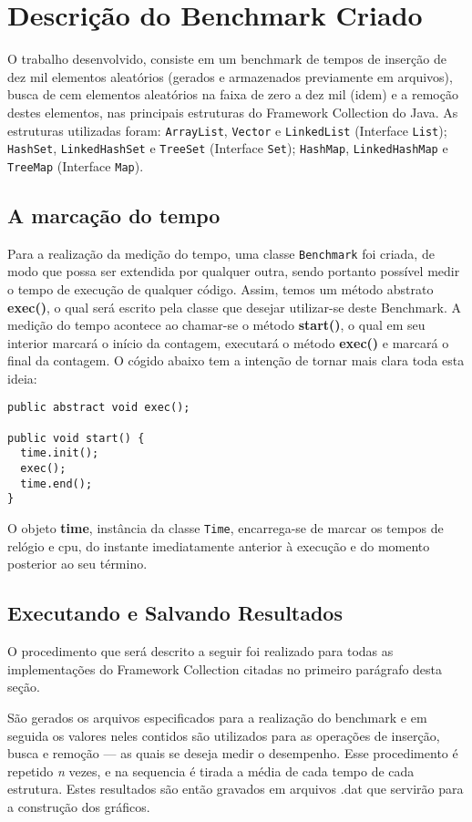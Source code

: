 \section{Descrição do Benchmark Criado} \label{sec:desc_bench}
	O trabalho desenvolvido, consiste em um benchmark de tempos de inserção de dez mil elementos aleatórios (gerados e armazenados previamente em arquivos), busca de cem elementos aleatórios na faixa de zero a dez mil (idem) e a remoção destes elementos, nas principais estruturas do Framework Collection do Java. As estruturas utilizadas foram: \texttt{ArrayList}, \texttt{Vector} e \texttt{LinkedList} (Interface \texttt{List}); \texttt{HashSet}, \texttt{LinkedHashSet} e \texttt{TreeSet} (Interface \texttt{Set}); \texttt{HashMap}, \texttt{LinkedHashMap} e \texttt{TreeMap} (Interface \texttt{Map}).

\subsection{A marcação do tempo}
	Para a realização da medição do tempo, uma classe \texttt{Benchmark} foi criada, de modo que possa ser extendida por qualquer outra, sendo portanto possível medir o tempo de execução de qualquer código. Assim, temos um método abstrato \textbf{exec()}, o qual será escrito pela classe que desejar utilizar-se deste Benchmark. A medição do tempo acontece ao chamar-se o método \textbf{start()}, o qual em seu interior marcará o início da contagem, executará o método \textbf{exec()} e marcará o final da contagem. O cógido abaixo tem a intenção de tornar mais clara toda esta ideia:

\newpage
	\begin{verbatim}
public abstract void exec();

public void start() {
  time.init();
  exec();
  time.end();
}
	\end{verbatim}
	O objeto \textbf{time}, instância da classe \texttt{Time}, encarrega-se de marcar os tempos de relógio e cpu, do instante imediatamente anterior à execução e do momento posterior ao seu término.

\subsection{Executando e Salvando Resultados} \label{subsec:exec_save}
	O procedimento que será descrito a seguir foi realizado para todas as implementações do Framework Collection citadas no primeiro parágrafo desta seção.

	São gerados os arquivos especificados para a realização do benchmark e em seguida os valores neles contidos são utilizados para as operações de inserção, busca e remoção --- as quais se deseja medir o desempenho. Esse procedimento é repetido \textsl{n} vezes, e na sequencia é tirada a média de cada tempo de cada estrutura. Estes resultados são então gravados em arquivos .dat que servirão para a construção dos gráficos.
